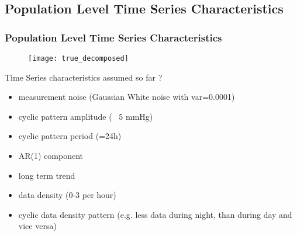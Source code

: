 \documentclass[
	8pt, %
]{beamer}
\begin{document}
\subsection{Population Level Time Series Characteristics}


\begin{frame}[fragile]
	\frametitle{Population Level Time Series Characteristics}

%
%

	\begin{figure}
			\texttt{[image: true\_decomposed]}
	\end{figure}


	Time Series characteristics assumed so far ?
	\begin{itemize}
		\item measurement noise (Gaussian White noise with var=0.0001)
		\item cyclic pattern amplitude (~ 5 mmHg)
		\item cyclic pattern period (=24h)
		\item AR(1) component
		\item long term trend
		\item data density (0-3 per hour)
		\item cyclic data density pattern (e.g. less data during night, than during day and vice versa)
	\end{itemize}
\end{frame}
\end{document}
